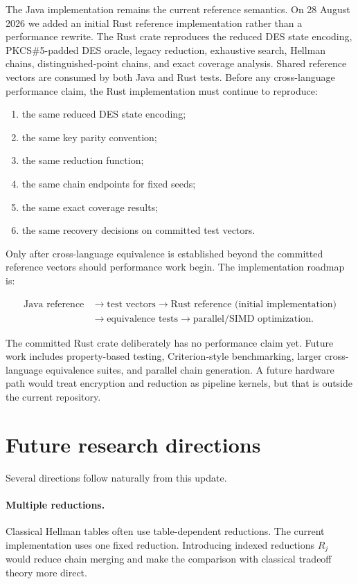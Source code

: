 \documentclass[11pt]{article}
\begin{document}
The Java implementation remains the current reference semantics.  On
28 August 2026 we added an initial Rust reference implementation rather than a
performance rewrite.  The Rust crate reproduces the reduced DES state encoding,
PKCS\#5-padded DES oracle, legacy reduction, exhaustive search, Hellman chains,
distinguished-point chains, and exact coverage analysis.  Shared reference
vectors are consumed by both Java and Rust tests.  Before any cross-language
performance claim, the Rust implementation must continue to reproduce:

\begin{enumerate}
  \item the same reduced DES state encoding;
  \item the same key parity convention;
  \item the same reduction function;
  \item the same chain endpoints for fixed seeds;
  \item the same exact coverage results;
  \item the same recovery decisions on committed test vectors.
\end{enumerate}

Only after cross-language equivalence is established beyond the committed
reference vectors should performance work begin.  The implementation roadmap is:

\[
\begin{aligned}
\text{Java reference}
&\longrightarrow \text{test vectors}
 \longrightarrow \text{Rust reference (initial implementation)}\\
&\longrightarrow \text{equivalence tests}
 \longrightarrow \text{parallel/SIMD optimization}.
\end{aligned}
\]

The committed Rust crate deliberately has no performance claim yet.  Future
work includes property-based testing, Criterion-style benchmarking, larger
cross-language equivalence suites, and parallel chain generation.  A future
hardware path would
treat encryption and reduction as pipeline kernels, but that is outside the
current repository.

\section{Future research directions}

Several directions follow naturally from this update.

\paragraph{Multiple reductions.}
Classical Hellman tables often use table-dependent reductions.  The current
implementation uses one fixed reduction.  Introducing indexed reductions
$R_j$ would reduce chain merging and make the comparison with classical
tradeoff theory more direct.
\end{document}
